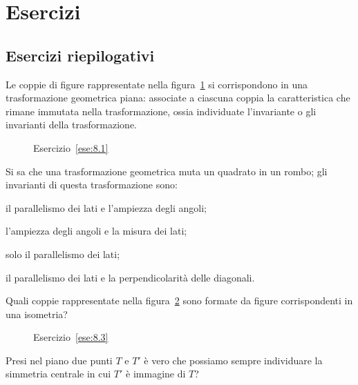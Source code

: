 
\section{Esercizi}

\subsection{Esercizi riepilogativi}

\begin{esercizio}
\label{ese:8.1}
Le coppie di figure rappresentate nella figura~\ref{fig:ese8.1} si corrispondono in una trasformazione geometrica piana: associate a ciascuna coppia la caratteristica che rimane immutata nella trasformazione, ossia individuate l'invariante o gli invarianti della trasformazione.
\end{esercizio}

\begin{figure}[!htb]
	\centering
	\caption{Esercizio~\ref{ese:8.1}}\label{fig:ese8.1}
\end{figure}

\begin{esercizio}
\label{ese:8.2}
Si sa che una trasformazione geometrica muta un quadrato in un rombo; gli invarianti di questa trasformazione sono:
\begin{enumeratea}
\item il parallelismo dei lati e l'ampiezza degli angoli;
\item l'ampiezza degli angoli e la misura dei lati;
\item solo il parallelismo 	dei lati;
\item il parallelismo dei lati e la perpendicolarità delle diagonali.
\end{enumeratea}
\end{esercizio}

\begin{esercizio}
\label{ese:8.3}
Quali coppie rappresentate nella figura~\ref{fig:ese8.3} sono formate da figure corrispondenti in una isometria?
\end{esercizio}

\begin{figure}[!htb]
	\centering
	\caption{Esercizio~\ref{ese:8.3}}\label{fig:ese8.3}
\end{figure}

\begin{esercizio}
\label{ese:8.4}
Presi nel piano due punti $T$ e $T'$ è vero che possiamo sempre individuare la simmetria centrale in cui $T'$ è immagine di $T$?
\end{esercizio}

